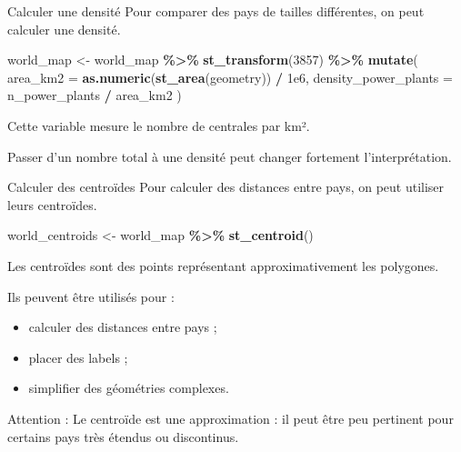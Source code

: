 \documentclass[
  10pt,
  ignorenonframetext,
]{beamer}
\newenvironment{Shaded}{\begin{snugshade}}{\end{snugshade}}
\newcommand{\AttributeTok}[1]{\textcolor[rgb]{0.13,0.29,0.53}{#1}}
\newcommand{\DecValTok}[1]{\textcolor[rgb]{0.00,0.00,0.81}{#1}}
\newcommand{\FloatTok}[1]{\textcolor[rgb]{0.00,0.00,0.81}{#1}}
\newcommand{\FunctionTok}[1]{\textcolor[rgb]{0.13,0.29,0.53}{\textbf{#1}}}
\newcommand{\NormalTok}[1]{#1}
\newcommand{\OtherTok}[1]{\textcolor[rgb]{0.56,0.35,0.01}{#1}}
\newcommand{\SpecialCharTok}[1]{\textcolor[rgb]{0.81,0.36,0.00}{\textbf{#1}}}
\begin{document}
\begin{frame}[fragile]{Calculer une densité}
\label{calculer-une-densituxe9}
Pour comparer des pays de tailles différentes, on peut calculer une
densité.

\begin{Shaded}
\begin{Highlighting}[]
\NormalTok{world\_map }\OtherTok{\textless{}{-}}\NormalTok{ world\_map }\SpecialCharTok{\%\textgreater{}\%}
  \FunctionTok{st\_transform}\NormalTok{(}\DecValTok{3857}\NormalTok{) }\SpecialCharTok{\%\textgreater{}\%}
  \FunctionTok{mutate}\NormalTok{(}
    \AttributeTok{area\_km2 =} \FunctionTok{as.numeric}\NormalTok{(}\FunctionTok{st\_area}\NormalTok{(geometry)) }\SpecialCharTok{/} \FloatTok{1e6}\NormalTok{,}
    \AttributeTok{density\_power\_plants =}\NormalTok{ n\_power\_plants }\SpecialCharTok{/}\NormalTok{ area\_km2}
\NormalTok{  )}
\end{Highlighting}
\end{Shaded}

Cette variable mesure le nombre de centrales par km².

Passer d'un nombre total à une densité peut changer fortement
l'interprétation.
\end{frame}

\begin{frame}[fragile]{Calculer des centroïdes}
\label{calculer-des-centrouxefdes}
Pour calculer des distances entre pays, on peut utiliser leurs
centroïdes.

\begin{Shaded}
\begin{Highlighting}[]
\NormalTok{world\_centroids }\OtherTok{\textless{}{-}}\NormalTok{ world\_map }\SpecialCharTok{\%\textgreater{}\%}
  \FunctionTok{st\_centroid}\NormalTok{()}
\end{Highlighting}
\end{Shaded}

Les centroïdes sont des points représentant approximativement les
polygones.

Ils peuvent être utilisés pour :

\begin{itemize}
\item calculer des distances entre pays ;
\item placer des labels ;
\item simplifier des géométries complexes.
\end{itemize}

Attention : Le centroïde est une approximation : il peut être peu
pertinent pour certains pays très étendus ou discontinus.
\end{frame}
\end{document}
